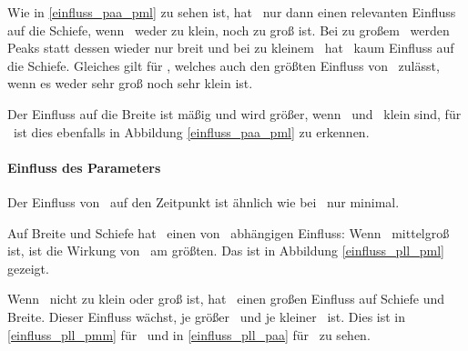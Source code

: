 Wie in \ref{einfluss_paa_pml} zu sehen ist, hat \paa\ nur dann einen relevanten Einfluss auf die Schiefe, wenn \pml\ weder zu klein, noch zu groß ist. Bei zu großem \pml\ werden Peaks statt dessen wieder nur breit und bei zu kleinem \pml\ hat \paa\ kaum Einfluss auf die Schiefe. Gleiches gilt für \pll, welches auch den größten Einfluss von \paa\ zulässt, wenn es weder sehr groß noch sehr klein ist.

Der Einfluss auf die Breite ist mäßig und wird größer, wenn \pml\ und \pll\ klein sind, für \pml\ ist dies ebenfalls in Abbildung \ref{einfluss_paa_pml} zu erkennen.


\paragraph*{Einfluss des Parameters \pll}

Der Einfluss von \pll\ auf den Zeitpunkt ist ähnlich wie bei \pml\ nur minimal.

Auf Breite und Schiefe hat \pll\ einen von \pml\ abhängigen Einfluss: Wenn \pml\ mittelgroß ist, ist die Wirkung von \pll\ am größten. Das ist in Abbildung \ref{einfluss_pll_pml} gezeigt.

Wenn \pml\ nicht zu klein oder groß ist, hat \pll\ einen großen Einfluss auf Schiefe und Breite. Dieser Einfluss wächst, je größer \pmm\ und je kleiner \paa\ ist. Dies ist in \ref{einfluss_pll_pmm} für \pmm\ und in \ref{einfluss_pll_paa} für \paa\ zu sehen. 

